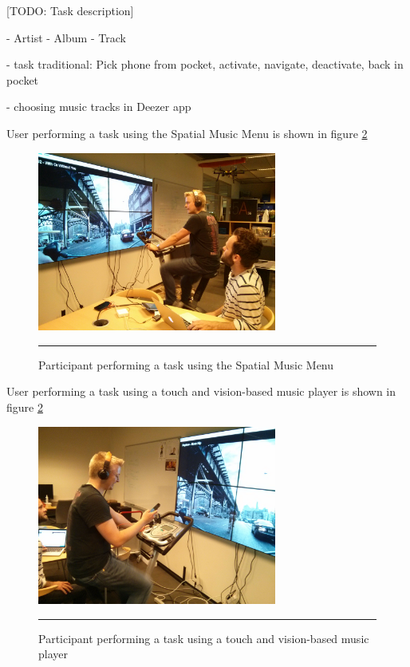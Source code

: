 [TODO: Task description]

- Artist - Album - Track

- task traditional: Pick phone from pocket, activate, navigate, deactivate, back in pocket

- choosing music tracks in Deezer app

User performing a task using the Spatial Music Menu is shown in figure \ref{fig:evalspatial}

\begin{figure}[htbp]
	\centering
		\includegraphics[width=0.7\textwidth,height=\textheight,keepaspectratio]{./Figures/evaluation_spatial.jpg}
		\rule{35em}{1pt}
	\caption[Evaluation Spatial Music Menu]{Participant performing a task using the Spatial Music Menu}
	\label{fig:evalspatial}
\end{figure}

User performing a task using a touch and vision-based music player is shown in figure \ref{fig:evalspatial}

\begin{figure}[htbp]
	\centering
		\includegraphics[width=0.7\textwidth,height=\textheight,keepaspectratio]{./Figures/evaluation_normal.jpg}
		\rule{35em}{1pt}
	\caption[Evaluation touch and vision-based interface]{Participant performing a task using a touch and vision-based music player}
	\label{fig:evalspatial}
\end{figure}


